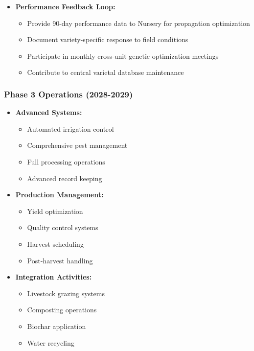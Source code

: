 \begin{itemize}
\begin{itemize}
\begin{itemize}
        \end{itemize}
        \item \textbf{Performance Feedback Loop:}
        \begin{itemize}
            \item Provide 90-day performance data to Nursery for propagation optimization
            \item Document variety-specific response to field conditions
            \item Participate in monthly cross-unit genetic optimization meetings
            \item Contribute to central varietal database maintenance
        \end{itemize}
    \end{itemize}
\end{itemize}

\subsubsection{Phase 3 Operations (2028-2029)}
\begin{itemize}
    \item \textbf{Advanced Systems:}
    \begin{itemize}
        \item Automated irrigation control
        \item Comprehensive pest management
        \item Full processing operations
        \item Advanced record keeping
    \end{itemize}
    \item \textbf{Production Management:}
    \begin{itemize}
        \item Yield optimization
        \item Quality control systems
        \item Harvest scheduling
        \item Post-harvest handling
    \end{itemize}
    \item \textbf{Integration Activities:}
    \begin{itemize}
        \item Livestock grazing systems
        \item Composting operations
        \item Biochar application
        \item Water recycling
    \end{itemize}
\end{itemize}


